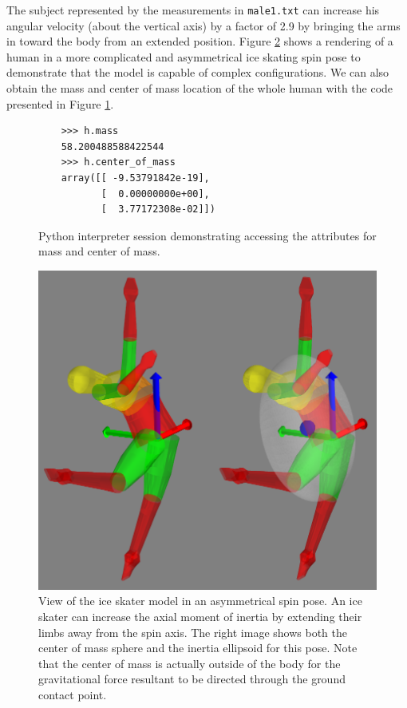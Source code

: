 \documentclass[10pt,a4paper,twocolumn]{article}
\begin{document}
The subject represented by the measurements in \verb+male1.txt+ can increase
his angular velocity (about the vertical axis) by a factor of 2.9 by bringing
the arms in toward the body from an extended position. Figure \ref{fig:iceskater} shows a rendering of a human in a more complicated and asymmetrical ice skating spin pose to demonstrate that the model is capable of complex configurations. We can also obtain the mass and center of mass location of the whole human with the code presented in Figure \ref{fig:mass-com-code}.

\begin{figure}
  \begin{verbatim}
    >>> h.mass
    58.200488588422544
    >>> h.center_of_mass
    array([[ -9.53791842e-19],
           [  0.00000000e+00],
           [  3.77172308e-02]])
  \end{verbatim}
  \caption{Python interpreter session demonstrating accessing the attributes for mass and center of mass.}
  \label{fig:mass-com-code}
\end{figure}

\begin{figure}
  \begin{center}
    \includegraphics[width=\columnwidth]{figures/ice-skater-double.png}
  \end{center}
  \caption{View of the ice skater model in an asymmetrical spin pose. An ice skater
    can increase the axial moment of inertia by extending their limbs away from the
    spin axis. The right image shows both the center of mass sphere and the inertia
    ellipsoid for this pose. Note that the center of mass is actually outside of the
    body for the gravitational force resultant to be directed through the ground
    contact point.
  }
  \label{fig:iceskater}
\end{figure}
\end{document}
